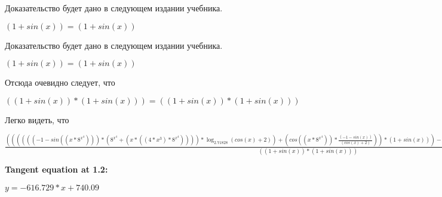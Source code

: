 \documentclass[12pt,a4paper,fleqn]{article}
\theoremstyle{definition}
\begin{document}
Доказательство будет дано в следующем издании учебника.

$( 1  + sin( x )) = ( 1  + sin( x ))$

Доказательство будет дано в следующем издании учебника.

$( 1  + sin( x )) = ( 1  + sin( x ))$

Отсюда очевидно следует, что

$(( 1  + sin( x )) * ( 1  + sin( x ))) = (( 1  + sin( x )) * ( 1  + sin( x )))$

Легко видеть, что

$\frac{(((((( -1  - sin(( x  * { 8 }^{{ x }^{ 4 }}))) * ({ 8 }^{{ x }^{ 4 }} + ( x  * (( 4  * { x }^{ 3 }) * { 8 }^{{ x }^{ 4 }})))) * \log_{ 2.71828 }{(cos( x ) +  2 )}) + (cos(( x  * { 8 }^{{ x }^{ 4 }})) * \frac{( -1  - sin( x ))}{(cos( x ) +  2 )}
)) * ( 1  + sin( x ))) - ((cos(( x  * { 8 }^{{ x }^{ 4 }})) * \log_{ 2.71828 }{(cos( x ) +  2 )}) * cos( x )))}{(( 1  + sin( x )) * ( 1  + sin( x )))}
 = \frac{(((((( -1  - sin(( x  * { 8 }^{{ x }^{ 4 }}))) * ({ 8 }^{{ x }^{ 4 }} + ( x  * (( 4  * { x }^{ 3 }) * { 8 }^{{ x }^{ 4 }})))) * \log_{ 2.71828 }{(cos( x ) +  2 )}) + (cos(( x  * { 8 }^{{ x }^{ 4 }})) * \frac{( -1  - sin( x ))}{(cos( x ) +  2 )}
)) * ( 1  + sin( x ))) - ((cos(( x  * { 8 }^{{ x }^{ 4 }})) * \log_{ 2.71828 }{(cos( x ) +  2 )}) * cos( x )))}{(( 1  + sin( x )) * ( 1  + sin( x )))}
$


\textbf{Tangent equation at 1.2:}

$y = -616.729 * x + 740.09$
\end{document}
